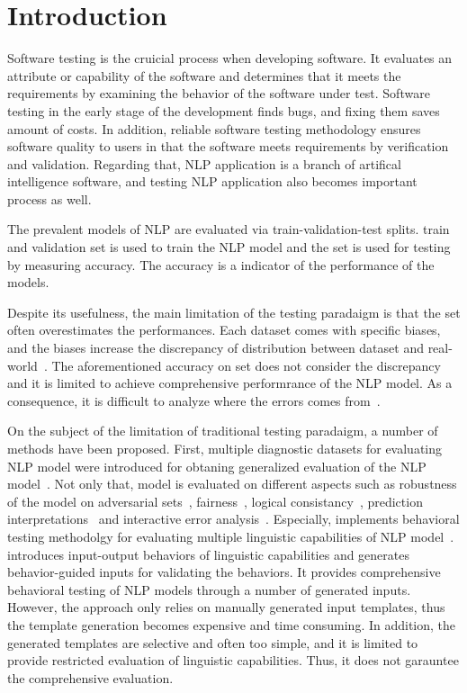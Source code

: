 \section{Introduction}
\label{sec:intro}

Software testing is the cruicial process when developing software.  It
evaluates an attribute or capability of the software and determines
that it meets the requirements by examining the behavior of the
software under test. Software testing in the early stage of the
development finds bugs, and fixing them saves amount of costs. In
addition, reliable software testing methodology ensures software
quality to users in that the software meets requirements by
verification and validation. Regarding that, NLP application is a
branch of artifical intelligence software, and testing NLP application
also becomes important process as well.

The prevalent models of NLP are evaluated via train-validation-test
splits. train and validation set is used to train the NLP model and
the \ho set is used for testing by measuring accuracy. The accuracy is
a indicator of the performance of the models.

Despite its usefulness, the main limitation of the testing paradaigm
is that the \ho set often overestimates the performances. Each dataset
comes with specific biases, and the biases increase the discrepancy of
distribution between dataset and
real-world~\cite{recht2019imagenetbias}. The aforementioned accuracy
on \ho set does not consider the discrepancy and it is limited to
achieve comprehensive performrance of the NLP model. As a consequence,
it is difficult to analyze where the errors comes
from~\cite{wu2019errudite}.

On the subject of the limitation of traditional testing paradaigm, a
number of methods have been proposed. First, multiple diagnostic
datasets for evaluating NLP model were introduced for obtaning
generalized evaluation of the NLP model~\cite{wang2018glue}. Not only
that, model is evaluated on different aspects such as robustness of
the model on adversarial
sets~\cite{ribeiro2018sear,belinkov2018breaknmt,
  rychalska2019wildnlp,iyyer2018adversarial},
fairness~\cite{prabhakaran2019fairness,rottger2020hatecheck}, logical
consistancy~\cite{ribeiro2019consistencyeval}, prediction
interpretations~\cite{ribeiroSG16lime} and interactive error
analysis~\cite{wu2019errudite}. Especially, \Chlst implements
behavioral testing methodolgy for evaluating multiple linguistic
capabilities of NLP model~\cite{marcoACL2020checklist}. \Chlst
introduces input-output behaviors of linguistic capabilities and
generates behavior-guided inputs for validating the behaviors. It
provides comprehensive behavioral testing of NLP models through a
number of generated inputs. However, the approach only relies on
manually generated input templates, thus the template generation
becomes expensive and time consuming. In addition, the generated
templates are selective and often too simple, and it is limited to
provide restricted evaluation of linguistic capabilities. Thus, it
does not garauntee the comprehensive evaluation.

